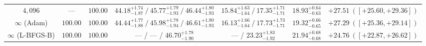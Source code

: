 \documentclass[10pt,a4paper]{article}
\begin{document}
\begin{table}[!htbp]
{\begin{tabular}{@{}ccccccc@{}}
$4{,}096$ & --- & $\mathbf{100.00}$ & $44.18^{+1.74}_{-1.87}\ /\ 45.77^{+1.79}_{-1.93}\ /\ \mathbf{46.44}^{+1.80}_{-1.93}$ & $15.84^{+1.63}_{-1.64}\ /\ 17.35^{+1.71}_{-1.71}$ & $18.93^{+0.64}_{-0.63}$ & $\mathbf{+27.51}\ ([+25.60, +29.36])$ \\
$\infty$ (Adam) & $100.00$ & $\mathbf{100.00}$ & $44.44^{+1.77}_{-1.88}\ /\ 45.98^{+1.78}_{-1.94}\ /\ \mathbf{46.61}^{+1.80}_{-1.93}$ & $16.13^{+1.66}_{-1.64}\ /\ 17.73^{+1.73}_{-1.71}$ & $19.32^{+0.66}_{-0.65}$ & $\mathbf{+27.29}\ ([+25.36, +29.14])$ \\
$\infty$ (L-BFGS-B) & $100.00$ & $\mathbf{100.00}$ & --- / --- / $\mathbf{46.70}^{+1.78}_{-1.90}$ & --- / $23.23^{+1.83}_{-1.92}$ & $21.94^{+0.68}_{-0.68}$ & $\mathbf{+24.76}\ ([+22.87, +26.62])$ \\
\bottomrule
\end{tabular}%
}
\end{table}
\end{document}
